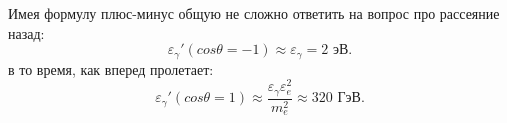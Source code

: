 Имея формулу плюс-минус общую не сложно ответить на вопрос про рассеяние назад:
\begin{equation*}
	\varepsilon_\gamma' (cos \theta = -1) \approx \varepsilon_\gamma = 2 \text{ эВ}. 
\end{equation*}
в то время, как вперед пролетает:
\begin{equation*}
	\varepsilon_\gamma' (cos \theta = 1) \approx \frac{\varepsilon_\gamma \varepsilon_e^2}{m_e^2} \approx 320 \text{ ГэВ}. 
\end{equation*}
